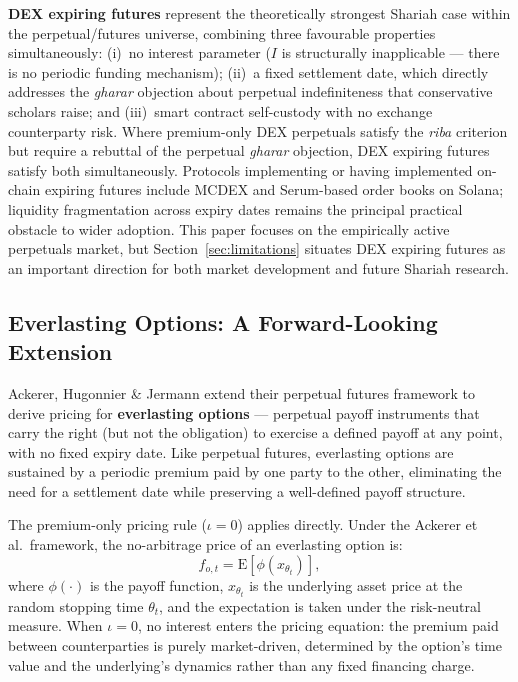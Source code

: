 \documentclass[10pt,twocolumn]{article}
\begin{document}
\textbf{DEX expiring futures} represent the theoretically strongest Shariah
case within the perpetual/futures universe, combining three favourable
properties simultaneously: (i)~no interest parameter ($I$ is structurally
inapplicable --- there is no periodic funding mechanism); (ii)~a fixed
settlement date, which directly addresses the \textit{gharar} objection about
perpetual indefiniteness that conservative scholars raise; and (iii)~smart
contract self-custody with no exchange counterparty risk. Where premium-only
DEX perpetuals satisfy the \textit{riba} criterion but require a rebuttal of
the perpetual \textit{gharar} objection, DEX expiring futures satisfy both
simultaneously. Protocols implementing or having implemented on-chain expiring
futures include MCDEX and Serum-based order books on Solana; liquidity
fragmentation across expiry dates remains the principal practical obstacle to
wider adoption. This paper focuses on the empirically active perpetuals market,
but Section~\ref{sec:limitations} situates DEX expiring futures as an important
direction for both market development and future Shariah research.

\subsection{Everlasting Options: A Forward-Looking Extension}
\label{sec:everlasting}

Ackerer, Hugonnier \& Jermann \cite{Ackerer2024} extend their perpetual futures
framework to derive pricing for \textbf{everlasting options} --- perpetual
payoff instruments that carry the right (but not the obligation) to exercise a
defined payoff at any point, with no fixed expiry date. Like perpetual futures,
everlasting options are sustained by a periodic premium paid by one party to the
other, eliminating the need for a settlement date while preserving a well-defined
payoff structure.

The premium-only pricing rule ($\iota = 0$) applies directly. Under the
Ackerer et al.\ framework, the no-arbitrage price of an everlasting option is:
\[
f_{o,t} = \mathrm{E}\!\left[\phi(x_{\theta_t})\right],
\]
where $\phi(\cdot)$ is the payoff function, $x_{\theta_t}$ is the underlying
asset price at the random stopping time $\theta_t$, and the expectation is taken
under the risk-neutral measure. When $\iota = 0$, no interest enters the pricing
equation: the premium paid between counterparties is purely market-driven,
determined by the option's time value and the underlying's dynamics rather than
any fixed financing charge.
\end{document}
